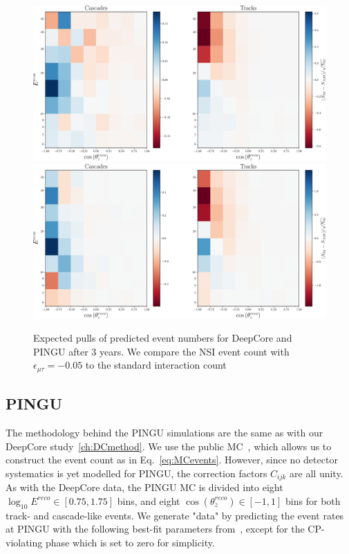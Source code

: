\documentclass[draft=True]{revtex4-2}
\newcommand{\zreco}{\ensuremath{\cos{(\theta_z^{reco})}}}
\newcommand{\emt}{\ensuremath{\epsilon_{\mu\tau}}}
\begin{document}
\begin{figure}[!tb]
   \begin{center}
      \includegraphics[width=0.7\linewidth]{figures/DC_event_pulls.pdf}
      \includegraphics[width=0.7\linewidth]{figures/PINGU_event_pulls.pdf}
   \end{center}
   \caption{Expected pulls of predicted event numbers for DeepCore and PINGU after 3 years. We compare the NSI event count with $\emt=-0.05$
    to the standard interaction count}\label{fig:event_pulls} %
\end{figure}


\subsection{PINGU}\label{ch:PINGUmethod}
The methodology behind the PINGU simulations are the same as with our DeepCore study~\ref{ch:DCmethod}. We use the public MC~\cite{PINGUdata}, which allows us to construct the event count as in Eq.~\ref{eq:MCevents}.
However, since no detector systematics is yet modelled for PINGU, the correction factors $C_{ijk}$ are all unity.
As with the DeepCore data, the PINGU MC is divided into eight 
$\log_{10}E^{reco} \in [0.75,1.75]$ bins, and eight $\zreco \in [-1,1]$ bins for both track- and cascade-like events. 
We generate "data" by predicting the event rates at PINGU with the following best-fit parameters from~\cite{nufit}, except for the CP-violating phase which is set to zero for simplicity.
\end{document}
